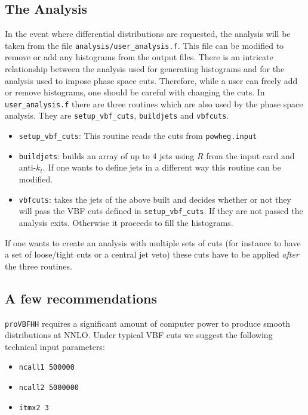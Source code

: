 \documentclass[12pt,a4]{article}
\newcommand{\provbfhh}{\texttt{proVBFHH}\xspace}
\begin{document}
\subsection{The Analysis}
In the event where differential distributions are requested, the
analysis will be taken from the file
\texttt{analysis/user\_analysis.f}.
%
This file can be modified to remove or add any histograms from the
output files.
%
There is an intricate relationship between the analysis used for
generating histograms and for the analysis used to impose phase space
cuts.
%
Therefore, while a user can freely add or remove histograms, one
should be careful with changing the cuts.
%
In \texttt{user\_analysis.f} there are three routines which are also
used by the phase space analysis.
%
They are \texttt{setup\_vbf\_cuts}, \texttt{buildjets} and
\texttt{vbfcuts}.

\begin{itemize}
  \item \texttt{setup\_vbf\_cuts}: This routine reads the cuts from
    \texttt{powheg.input}
  \item \texttt{buildjets}: builds an array of up to 4 jets using $R$
    from the input card and anti-$k_t$. If one wants to define jets in
    a different way this routine can be modified.
  \item \texttt{vbfcuts}: takes the jets of the above built and
    decides whether or not they will pass the VBF cuts defined in
    \texttt{setup\_vbf\_cuts}. If they are not passed the analysis
    exits. Otherwise it proceeds to fill the histograms.
\end{itemize}

If one wants to create an analysis with multiple sets of cuts (for
instance to have a set of loose/tight cuts or a central jet veto) these
cuts have to be applied \emph{after} the three routines.

\subsection{A few recommendations}
\provbfhh requires a significant amount of computer power to produce
smooth distributions at NNLO.
%
Under typical VBF cuts we suggest the following technical input
parameters:

\begin{itemize}
\item \texttt{ncall1 500000}
\item \texttt{ncall2 5000000}
\item \texttt{itmx2 3}
\end{itemize}
\end{document}
